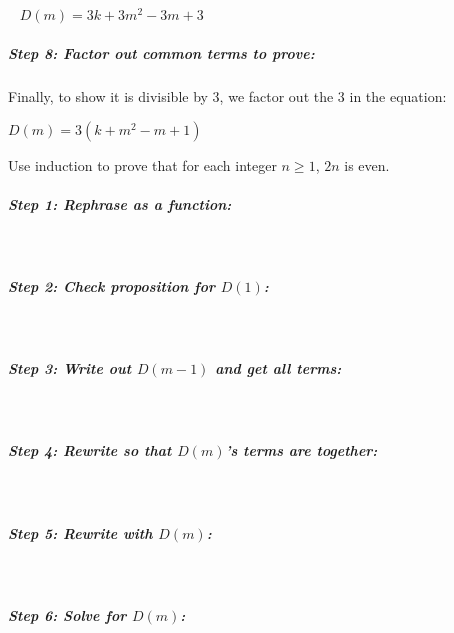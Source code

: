 \begin{intro}{\ }
                $D(m) = 3k + 3m^{2} - 3m + 3$

            \subparagraph{Step 8: Factor out common terms to prove:}
                Finally, to show it is divisible by 3, we factor out
                the 3 in the equation:

                $D(m) = 3(k + m^{2} - m + 1)$
        \end{intro}

        \newpage
        
        \begin{questionNOGRADE}{\thequestion}
            Use induction to prove that for each integer $n \geq 1$, $2n$ is even.

            \subparagraph{Step 1: Rephrase as a function:} ~\\
            
            \subparagraph{Step 2: Check proposition for $D(1)$:} ~\\

            \subparagraph{Step 3: Write out $D(m-1)$ and get all terms:} ~\\            

            \subparagraph{Step 4: Rewrite so that $D(m)$'s terms are together:} ~\\

            \subparagraph{Step 5: Rewrite with $D(m)$:}~\\

            \subparagraph{Step 6: Solve for $D(m)$:}~\\


\end{questionNOGRADE}
